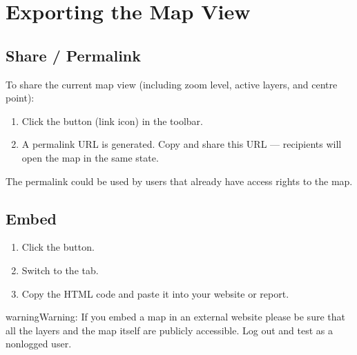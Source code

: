 \documentclass[letterpaper,10pt,english]{sphinxmanual}
\begin{document}
\section{Exporting the Map View}
\label{\detokenize{04_exploring_maps:exporting-the-map-view}}

\subsection{Share / Permalink}
\label{\detokenize{04_exploring_maps:share-permalink}}
\sphinxAtStartPar
To share the current map view (including zoom level, active layers, and centre point):
\begin{enumerate}
%
\item {} 
\sphinxAtStartPar
Click the  button (link icon) in the toolbar.

\item {} 
\sphinxAtStartPar
A permalink URL is generated. Copy and share this URL — recipients will open the map
in the same state.

\end{enumerate}

\sphinxAtStartPar
The permalink could be used by users that already have access rights to the map.


\subsection{Embed}
\label{\detokenize{04_exploring_maps:embed}}\begin{enumerate}
%
\item {} 
\sphinxAtStartPar
Click the  button.

\item {} 
\sphinxAtStartPar
Switch to the  tab.

\item {} 
\sphinxAtStartPar
Copy the HTML  code and paste it into your website or report.

\end{enumerate}

\begin{sphinxadmonition}{warning}{Warning:}
\sphinxAtStartPar
If you embed a map in an external website please be sure that all the layers
and the map itself are publicly accessible. Log out and test as a non\sphinxhyphen{}logged user.
\end{sphinxadmonition}
\end{document}
